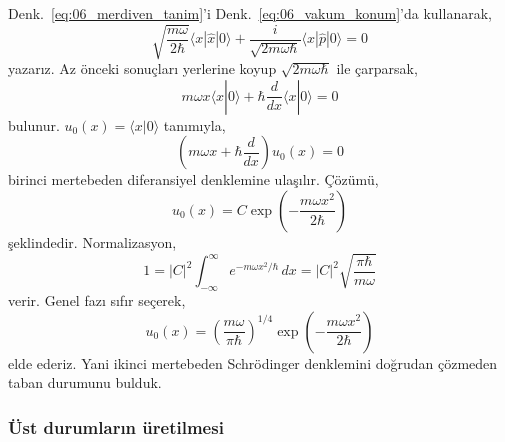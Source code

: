 \documentclass[00_kitap.tex]{subfiles}
\begin{document}
Denk.~\eqref{eq:06_merdiven_tanim}'i
Denk.~\eqref{eq:06_vakum_konum}'da kullanarak,
\begin{equation}
 \sqrt{\frac{m\omega}{2\hbar}}\langle x|\hat x|0\rangle
 +\frac{i}{\sqrt{2m\omega\hbar}}\langle x|\hat p|0\rangle=0
\end{equation}
yazarız. Az önceki sonuçları yerlerine koyup
$\sqrt{2m\omega\hbar}$ ile çarparsak,
\begin{equation}
 m\omega x\langle x|0\rangle
 +\hbar\frac{d}{dx}\langle x|0\rangle=0
\end{equation}
bulunur. $u_0(x)=\langle x|0\rangle$ tanımıyla,
\begin{equation}
 \left(m\omega x+\hbar\frac{d}{dx}\right)u_0(x)=0
\end{equation}
birinci mertebeden diferansiyel denklemine ulaşılır. Çözümü,
\begin{equation}
 u_0(x)=C\exp\left(-\frac{m\omega x^2}{2\hbar}\right)
\end{equation}
şeklindedir. Normalizasyon,
\begin{equation}
 1=|C|^2\int_{-\infty}^{\infty}e^{-m\omega x^2/\hbar}\,dx
 =|C|^2\sqrt{\frac{\pi\hbar}{m\omega}}
\end{equation}
verir. Genel fazı sıfır seçerek,
\begin{equation}
 \boxed{u_0(x)=\left(\frac{m\omega}{\pi\hbar}\right)^{1/4}
              \exp\left(-\frac{m\omega x^2}{2\hbar}\right)}
 \label{eq:06_taban_df}
\end{equation}
elde ederiz. Yani ikinci mertebeden Schrödinger denklemini doğrudan
çözmeden taban durumunu bulduk.

\subsubsection{Üst durumların üretilmesi}
\end{document}
